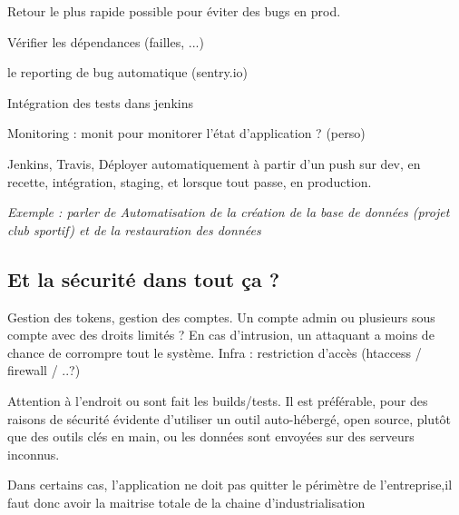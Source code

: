 Retour le plus rapide possible pour éviter des bugs en prod. 

Vérifier les dépendances (failles, ...)

le reporting de bug automatique (sentry.io)

Intégration des tests dans jenkins

Monitoring : monit pour monitorer l'état d'application ? (perso)

Jenkins, Travis, Déployer automatiquement à partir d'un push sur dev, en recette, intégration, staging, et lorsque tout passe, en production.

\textit{Exemple : parler de \clubSportif Automatisation de la création de la base de données (projet club sportif) et de la restauration des données}

\subsection{Et la sécurité dans tout ça ?}

Gestion des tokens, gestion des comptes.
Un compte admin ou plusieurs sous compte avec des droits limités ? En cas d'intrusion, un attaquant a moins de chance de corrompre tout le système.
Infra : restriction d'accès (htaccess / firewall / ..?)


Attention à l'endroit ou sont fait les builds/tests. Il est préférable, pour des raisons de sécurité évidente d'utiliser un outil auto-hébergé, open source, plutôt que des outils clés en main, ou les données sont envoyées sur des serveurs inconnus. 

Dans certains cas, l'application ne doit pas quitter le périmètre de l'entreprise,il faut donc avoir la maitrise totale de la chaine d'industrialisation